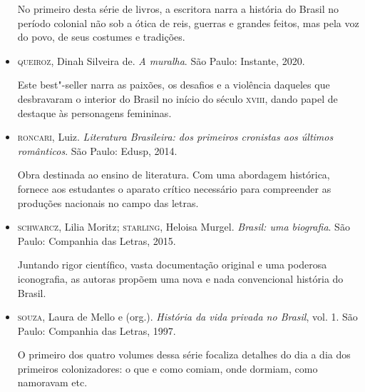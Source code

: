 \documentclass[12pt]{extarticle}
\begin{document}
\begin{itemize}
No primeiro desta série de livros, a escritora narra a história do
Brasil no período colonial não sob a ótica de reis, guerras e grandes
feitos, mas pela voz do povo, de seus costumes e tradições.

\item\textsc{queiroz}, Dinah Silveira de. \textit{A muralha}. São Paulo: Instante,
2020.

Este best"-seller narra as paixões, os desafios e a violência daqueles
que desbravaram o interior do Brasil no início do século \textsc{xviii}, dando
papel de destaque às personagens femininas.

\item\textsc{roncari}, Luiz. \textit{Literatura Brasileira: dos primeiros cronistas
aos últimos românticos}. São Paulo: Edusp, 2014.

Obra destinada ao ensino de literatura. Com uma abordagem histórica,
fornece aos estudantes o aparato crítico necessário para compreender as
produções nacionais no campo das letras.

\item\textsc{schwarcz}, Lilia Moritz; \textsc{starling}, Heloisa Murgel. \textit{Brasil: uma biografia}. São Paulo: Companhia das Letras, 2015.

Juntando rigor científico, vasta documentação original e uma poderosa
iconografia, as autoras propõem uma nova e nada convencional história do
Brasil.

\item\textsc{souza}, Laura de Mello e (org.). \textit{História da vida privada no
Brasil}, vol. 1. São Paulo: Companhia das Letras, 1997.

O primeiro dos quatro volumes dessa série focaliza detalhes do dia a dia
dos primeiros colonizadores: o que e como comiam, onde dormiam, como
namoravam etc.
\end{itemize}
\end{document}
